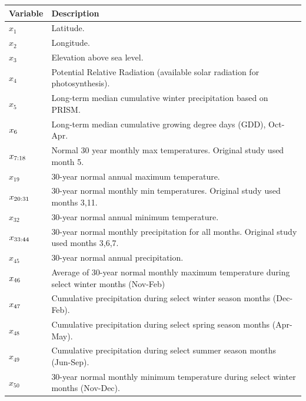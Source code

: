 \def\year{2017}\relax \documentclass[letterpaper]{article}
\begin{document}
\begin{table}
\begin{tabularx}{\linewidth}{@{ }l X@{ }}
\toprule[.2em]
{\bf Variable} &{\bf Description} \\
\midrule
$x_1$ & Latitude.\\
$x_2$ & Longitude. \\
\cellcolor[gray]{0.9}$x_3$ & \cellcolor[gray]{0.9}Elevation above sea level.\\
\cellcolor[gray]{0.9}$x_4$ & \cellcolor[gray]{0.9}Potential Relative Radiation (available solar radiation for photosynthesis).\\
$x_{5}$ & Long-term median cumulative winter precipitation based on PRISM.\\
$\cellcolor[gray]{0.9}x_{6}$ & \cellcolor[gray]{0.9}Long-term median cumulative growing degree days (GDD), Oct-Apr.\\
$\cellcolor[gray]{0.9}x_{7:18}$ & \cellcolor[gray]{0.9}Normal 30 year monthly max temperatures. Original study used month 5.\\
$x_{19}$ & 30-year normal annual maximum temperature.\\
$\cellcolor[gray]{0.9}x_{20:31}$ & \cellcolor[gray]{0.9}30-year normal monthly min temperatures. Original study used months 3,11.\\
$x_{32}$ & 30-year normal annual minimum temperature.\\
$\cellcolor[gray]{0.9}x_{33:44}$ & \cellcolor[gray]{0.9}30-year normal monthly precipitation for all months. Original study used months 3,6,7.\\
$x_{45}$ & 30-year normal annual precipitation.\\
$\cellcolor[gray]{0.9}x_{46}$ &\cellcolor[gray]{0.9} Average of 30-year normal monthly maximum temperature during select winter months (Nov-Feb)\\
$\cellcolor[gray]{0.9}x_{47}$ &\cellcolor[gray]{0.9} Cumulative precipitation during select winter season months (Dec-Feb).\\
$x_{48}$ & Cumulative precipitation during select spring season months (Apr-May).\\
$x_{49}$ & Cumulative precipitation during select  summer season months (Jun-Sep).\\
$x_{50}$ & 30-year normal monthly minimum temperature during select winter months (Nov-Dec).\\

\end{tabularx}
\end{table}
\end{document}
